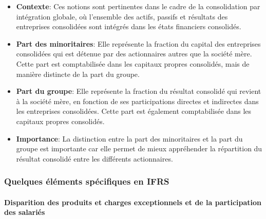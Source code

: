 \documentclass[a4paper, 12pt]{report}
\begin{document}
\begin{itemize}
	\item \textbf{Contexte}: Ces notions sont pertinentes dans le cadre de la consolidation par intégration globale, où l'ensemble des actifs, passifs et résultats des entreprises consolidées sont intégrés dans les états financiers consolidés.
	\item \textbf{Part des minoritaires}: Elle représente la fraction du capital des entreprises consolidées qui est détenue par des actionnaires autres que la société mère. Cette part est comptabilisée dans les capitaux propres consolidés, mais de manière distincte de la part du groupe.
	\item \textbf{Part du groupe}: Elle représente la fraction du résultat consolidé qui revient à la société mère, en fonction de ses participations directes et indirectes dans les entreprises consolidées. Cette part est également comptabilisée dans les capitaux propres consolidés.
	\item \textbf{Importance}: La distinction entre la part des minoritaires et la part du groupe est importante car elle permet de mieux appréhender la répartition du résultat consolidé entre les différents actionnaires.
\end{itemize}

\subsubsection{Quelques éléments spécifiques en IFRS}

\paragraph{Disparition des produits et charges exceptionnels et de la participation des salariés}
\end{document}
